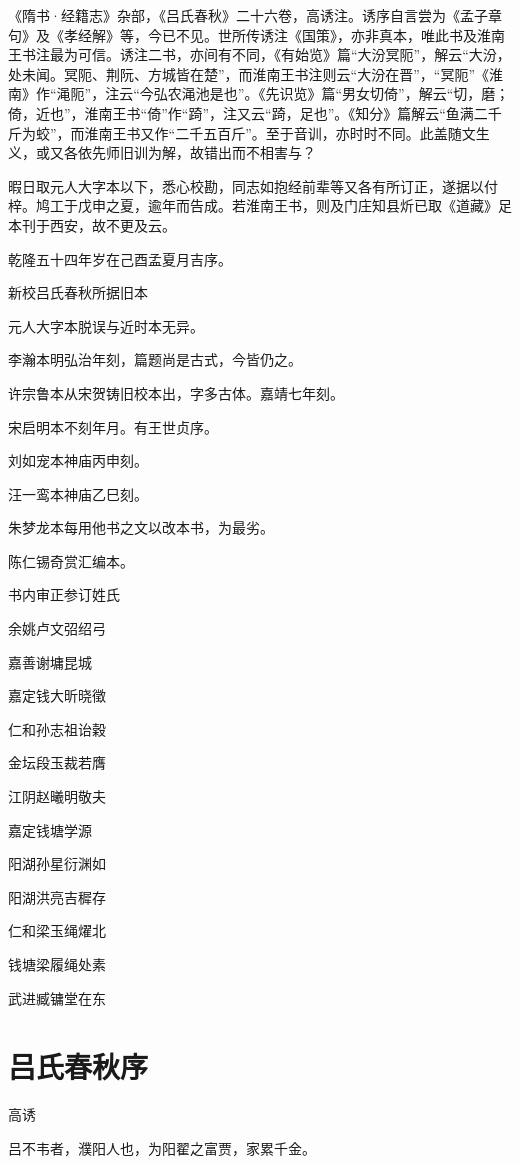 \documentclass[12pt,UTF8]{ctexbook}
\begin{document}
《隋书·经籍志》杂部，《吕氏春秋》二十六卷，高诱注。诱序自言尝为《孟子章句》及《孝经解》等，今已不见。世所传诱注《国策》，亦非真本，唯此书及淮南王书注最为可信。诱注二书，亦间有不同，《有始览》篇“大汾冥阨”，解云“大汾，处未闻。冥阨、荆阮、方城皆在楚”，而淮南王书注则云“大汾在晋”，“冥阨”《淮南》作“渑阨”，注云“今弘农渑池是也”。《先识览》篇“男女切倚”，解云“切，磨；倚，近也”，淮南王书“倚”作“踦”，注又云“踦，足也”。《知分》篇解云“鱼满二千斤为蛟”，而淮南王书又作“二千五百斤”。至于音训，亦时时不同。此盖随文生义，或又各依先师旧训为解，故错出而不相害与？

暇日取元人大字本以下，悉心校勘，同志如抱经前辈等又各有所订正，遂据以付梓。鸠工于戊申之夏，逾年而告成。若淮南王书，则及门庄知县炘已取《道藏》足本刊于西安，故不更及云。

乾隆五十四年岁在己酉孟夏月吉序。

新校吕氏春秋所据旧本


元人大字本脱误与近时本无异。

李瀚本明弘治年刻，篇题尚是古式，今皆仍之。

许宗鲁本从宋贺铸旧校本出，字多古体。嘉靖七年刻。

宋启明本不刻年月。有王世贞序。

刘如宠本神庙丙申刻。

汪一鸾本神庙乙巳刻。

朱梦龙本每用他书之文以改本书，为最劣。

陈仁锡奇赏汇编本。





书内审正参订姓氏


余姚卢文弨绍弓

嘉善谢墉昆城

嘉定钱大昕晓徵

仁和孙志祖诒穀

金坛段玉裁若膺

江阴赵曦明敬夫

嘉定钱塘学源

阳湖孙星衍渊如

阳湖洪亮吉穉存

仁和梁玉绳燿北

钱塘梁履绳处素

武进臧镛堂在东

\chapter{吕氏春秋序}

高诱

吕不韦者，濮阳人也，为阳翟之富贾，家累千金。
\end{document}

